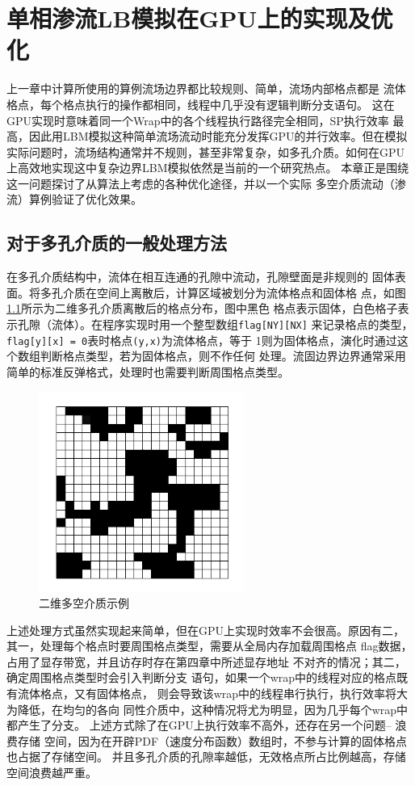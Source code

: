 \chapter{单相渗流LB模拟在GPU上的实现及优化}
上一章中计算所使用的算例流场边界都比较规则、简单，流场内部格点都是
流体格点，每个格点执行的操作都相同，线程中几乎没有逻辑判断分支语句。
这在GPU实现时意味着同一个Wrap中的各个线程执行路径完全相同，SP执行效率
最高，因此用LBM模拟这种简单流场流动时能充分发挥GPU的并行效率。但在模拟
实际问题时，流场结构通常并不规则，甚至非常复杂，如多孔介质。如何在GPU
上高效地实现这中复杂边界LBM模拟依然是当前的一个研究热点。
本章正是围绕这一问题探讨了从算法上考虑的各种优化途径，并以一个实际
多空介质流动（渗流）算例验证了优化效果。

\section{对于多孔介质的一般处理方法}
在多孔介质结构中，流体在相互连通的孔隙中流动，孔隙壁面是非规则的
固体表面。将多孔介质在空间上离散后，计算区域被划分为流体格点和固体格
点，如图\ref{fig:porous_2d}所示为二维多孔介质离散后的格点分布，图中黑色
格点表示固体，白色格子表示孔隙（流体）。在程序实现时用一个整型数组\verb+flag[NY][NX]+
来记录格点的类型，\verb+flag[y][x] = 0+表时格点\verb+(y,x)+为流体格点，等于
1则为固体格点，演化时通过这个数组判断格点类型，若为固体格点，则不作任何
处理。流固边界边界通常采用简单的标准反弹格式，处理时也需要判断周围格点类型。
\begin{figure}[htb]
  \centering
  \includegraphics[width=0.6\textwidth]{img/porous_2d}
  \caption{二维多空介质示例}
  \label{fig:porous_2d}
\end{figure}

上述处理方式虽然实现起来简单，但在GPU上实现时效率不会很高。原因有二，
其一，处理每个格点时要周围格点类型，需要从全局内存加载周围格点
flag数据，占用了显存带宽，并且访存时存在第四章中所述显存地址
不对齐的情况；其二，确定周围格点类型时会引入判断分支
语句，如果一个wrap中的线程对应的格点既有流体格点，又有固体格点，
则会导致该wrap中的线程串行执行，执行效率将大为降低，在均匀的各向
同性介质中，这种情况将尤为明显，因为几乎每个wrap中都产生了分支。
上述方式除了在GPU上执行效率不高外，还存在另一个问题\--- 浪费存储
空间，因为在开辟PDF（速度分布函数）数组时，不参与计算的固体格点也占据了存储空间。
并且多孔介质的孔隙率越低，无效格点所占比例越高，存储空间浪费越严重。

